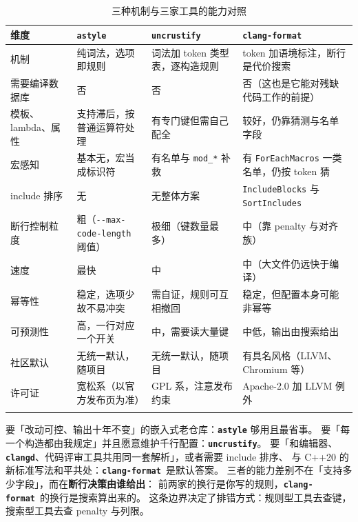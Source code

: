 \documentclass[12pt,a4paper,fontset=fandol]{ctexbook}
\newcommand{\cpp}[1]{C++#1}
\newcommand{\Opt}[1]{\texttt{-\/-#1}}
\newcommand{\Lib}[1]{\textbf{\texttt{#1}}}
\newcommand{\Fmt}{\Lib{clang-format}}
\newcommand{\CD}{\Lib{clangd}}
\begin{document}
{\footnotesize
\begin{longtable}{%
  >{\raggedright\arraybackslash}p{}%
  >{\raggedright\arraybackslash}p{}%
  >{\raggedright\arraybackslash}p{}%
  >{\raggedright\arraybackslash}p{}%
  }
  \toprule
  维度 & \Lib{astyle} & \Lib{uncrustify} & \Lib{clang-format} \\
  \midrule
  \endhead
  机制 & 纯词法，选项即规则 & 词法加 token 类型表，逐构造规则 & token 加语境标注，断行是代价搜索 \\
  需要编译数据库 & 否 & 否 & 否（这也是它能对残缺代码工作的前提） \\
  模板、lambda、属性 & 支持滞后，按普通运算符处理 & 有专门键但需自己配全 & 较好，仍靠猜测与名单字段 \\
  宏感知 & 基本无，宏当成标识符 & 有名单与 \texttt{mod\_*} 补救 & 有 \texttt{ForEachMacros} 一类名单，仍按 token 猜 \\
  include 排序 & 无 & 无整体方案 & \texttt{IncludeBlocks} 与 \texttt{SortIncludes} \\
  断行控制粒度 & 粗（\Opt{max-code-length} 阈值） & 极细（键数量最多） & 中（靠 penalty 与对齐族） \\
  速度 & 最快 & 中 & 中（大文件仍远快于编译） \\
  幂等性 & 稳定，选项少故不易冲突 & 需自证，规则可互相撤回 & 稳定，但配置本身可能非幂等 \\
  可预测性 & 高，一行对应一个开关 & 中，需要读大量键 & 中低，输出由搜索给出 \\
  社区默认 & 无统一默认，随项目 & 无统一默认，随项目 & 有具名风格（LLVM、Chromium 等） \\
  许可证 & 宽松系（以官方发布页为准） & GPL 系，注意发布约束 & Apache-2.0 加 LLVM 例外 \\
  \bottomrule
  \caption{三种机制与三家工具的能力对照}
  \label{tab:ch11-mech}
\end{longtable}
}

\begin{compare}[title={能力边界：谁在什么情况下必须让位}]
  要「改动可控、输出十年不变」的嵌入式老仓库：\Lib{astyle} 够用且最省事。
  要「每一个构造都由我规定」并且愿意维护千行配置：\Lib{uncrustify}。
  要「和编辑器、\CD、代码评审工具共用同一套解析」，或者需要 include 排序、
  与 \cpp{20} 的新标准写法和平共处：\Fmt\ 是默认答案。
  三者的能力差别不在「支持多少字段」，而在\textbf{断行决策由谁给出}：
  前两家的换行是你写的规则，\Fmt\ 的换行是搜索算出来的。
这条边界决定了排错方式：规则型工具去查键，搜索型工具去查 penalty 与列限。
\end{compare}
\end{document}
